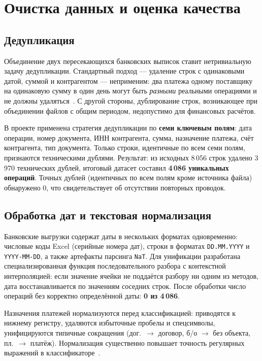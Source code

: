 \section{Очистка данных и оценка качества}

\subsection*{Дедупликация}

Объединение двух пересекающихся банковских выписок ставит нетривиальную задачу дедупликации. Стандартный подход --- удаление строк с одинаковыми датой, суммой и контрагентом --- неприменим: два платежа одному поставщику на одинаковую сумму в один день могут быть \textit{разными} реальными операциями и не должны удаляться~\cite{whittington2012principles}. С другой стороны, дублирование строк, возникающее при объединении файлов с общим периодом, недопустимо для финансовых расчётов.

В проекте применена стратегия дедупликации по \textbf{семи ключевым полям}: дата операции, номер документа, ИНН контрагента, сумма, назначение платежа, счёт контрагента, тип документа. Только строки, идентичные по всем семи полям, признаются техническими дублями. Результат: из исходных 8\,056 строк удалено 3\,970 технических дублей, итоговый датасет составил \textbf{4\,086 уникальных операций}. Точных дублей (идентичных по всем полям кроме источника файла) обнаружено 0, что свидетельствует об отсутствии повторных проводок.

\subsection*{Обработка дат и текстовая нормализация}

Банковские выгрузки содержат даты в нескольких форматах одновременно: числовые коды Excel (серийные номера дат), строки в форматах \texttt{DD.MM.YYYY} и \texttt{YYYY-MM-DD}, а также артефакты парсинга \texttt{NaT}. Для унификации разработана специализированная функция последовательного разбора с контекстной интерполяцией: если значение ячейки не поддаётся разбору ни одним из методов, дата восстанавливается по значениям соседних строк. После обработки число операций без корректно определённой даты: \textbf{0 из 4\,086}.

Назначения платежей нормализуются перед классификацией: приводятся к нижнему регистру, удаляются избыточные пробелы и спецсимволы, унифицируются типичные сокращения (дог.\ $\to$ договор, б/о $\to$ без объекта, пл.\ $\to$ платёж). Нормализация существенно повышает точность регулярных выражений в классификаторе~\cite{Cohen1995}.

